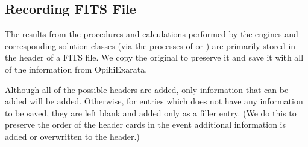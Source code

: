 \documentclass[letterpaper,11pt,english]{sphinxmanual}
\begin{document}
\sphinxstepscope


\subsection{Recording FITS File}
\label{\detokenize{user/recording_fits_file:recording-fits-file}}\label{\detokenize{user/recording_fits_file:user-recording-fits-file}}\label{\detokenize{user/recording_fits_file::doc}}
\sphinxAtStartPar
The results from the procedures and calculations performed by the engines and
corresponding solution classes (via the processes of {\hyperref[\detokenize{user/manual_mode:user-manual-mode}]{}}
or {\hyperref[\detokenize{user/automatic_mode:user-automatic-mode}]{}}) are primarily stored in the header of a FITS
file. We copy the original to preserve it and save it with all of the
information from OpihiExarata.

\sphinxAtStartPar
Although all of the possible headers are added, only information that
can be added will be added. Otherwise, for entries which does not have any
information to be saved, they are left blank and added only as a filler
entry. (We do this to preserve the order of the header cards in the event
additional information is added or overwritten to the header.)
\end{document}

